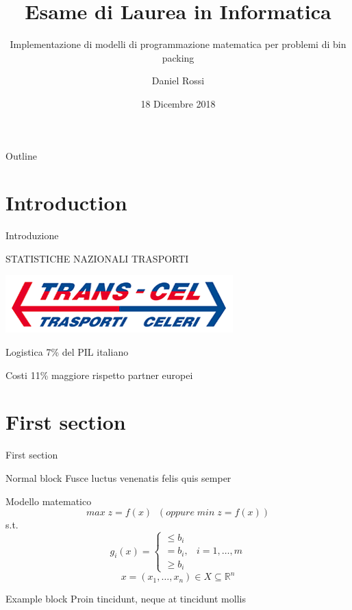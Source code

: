 \documentclass{beamer}
\title{Esame di Laurea in Informatica}
\subtitle{Implementazione di modelli di programmazione matematica per problemi di bin packing}
\author{Daniel Rossi}
\date{18 Dicembre 2018}
\begin{document}
	\maketitle

	\begin{frame}{Outline}
		\tableofcontents
	\end{frame}

	\section{Introduction}

	\begin{frame}{Introduzione}
		\begin{minipage}[c]{0.45\textwidth}
			\large{\uppercase{Statistiche nazionali trasporti}} \vspace{.5em}
		\end{minipage}
			\hfill
			\begin{minipage}[c]{0.45\textwidth}
				\includegraphics[width=\textwidth]{figures/logo}
			\end{minipage}
			\begin{block}{Logistica}
				7\% del PIL italiano
			\end{block}
			\begin{block}{Costi}
				11\% maggiore rispetto partner europei
			\end{block}
	\end{frame}


	\section{First section}

	\begin{frame}{First section}
		\begin{block}{Normal block}
			Fusce luctus venenatis felis quis semper
		\end{block}

		\begin{alertblock}{Modello matematico}
			$$ max\; z = f ( x )\;\; (oppure\; min\; z = f ( x ))$$
			s.t.
			$$g_i (x) = \begin{cases} \leq b_i \\ = b_i, & i = 1,\dots,m \\ \geq b_i \end{cases}$$
			$$x = (x_1,\dots,x_n) \in X \subseteq \mathbb{R}^n$$
		\end{alertblock}

		\begin{exampleblock}{Example block}
			Proin tincidunt, neque at tincidunt mollis
		\end{exampleblock}
	\end{frame}
	
\end{document}
